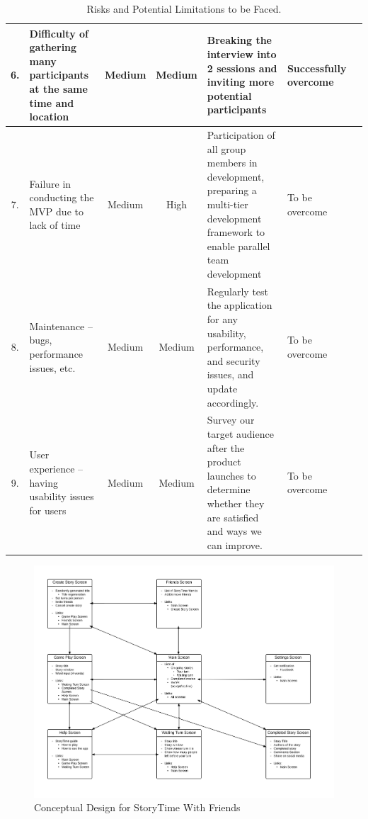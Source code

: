 \documentclass{sigchi}
\begin{document}
\begin{table}[h!]
\begin{tabular}{ c | >{\raggedright}p{4cm} | c | c | >{\raggedright}p{5cm} | >{\raggedright\centering}p{2cm} l}
6. &
Difficulty of gathering many participants at the same time and location &
Medium &
Medium &
Breaking the interview into 2 sessions and inviting more potential participants &
Successfully overcome & \\ \hline

7. &
Failure in conducting the MVP due to lack of time &
Medium &
High &
Participation of all group members in development, preparing a multi-tier development framework to enable parallel team development &
To be overcome & \\ \hline

8. &
Maintenance – bugs, performance issues, etc. &
Medium &
Medium &
Regularly test the application for any usability, performance, and security issues, and update accordingly. &
To be overcome & \\ \hline

9. &
User experience – having usability issues for users &
Medium &
Medium &
Survey our target audience after the product launches to determine whether they are satisfied and ways we can improve. &
To be overcome & \\
\end{tabular}
\smallskip
\caption{Risks and Potential Limitations to be Faced.}
\label{tab:risks}
\end{table}


\label{apx:conceptual}


\begin{figure}[h!]
\centering
\includegraphics[width=\linewidth]{image00.png}
\caption{Conceptual Design for StoryTime With Friends}
\label{fig:conceptual}
\end{figure}
\end{document}

